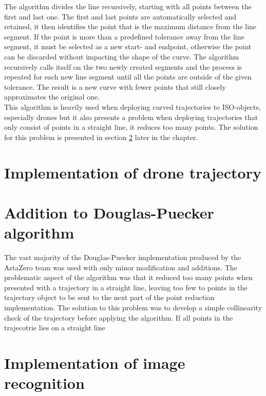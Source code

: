 The algorithm divides the line recursively, starting with all points between the first and last one. The first and last points are automatically selected and retained, it then identifies the point that is the maximum distance from the line segment. If the point is more than a predefined tolerance away from the line segment, it must be selected as a new start- and endpoint, otherwise the point can be discarded without impacting the shape of the curve. The algorithm recursively calls itself on the two newly created segments and the process is repeated for each new line segment until all the points are outside of the given tolerance. The result is a new curve with fewer points that still closely approximates the original one. \\ 

This algorithm is heavily used when deploying curved trajectories to ISO-objects, especially drones but it also presents a problem when deploying trajectories that only consist of points in a straight line, it reduces too many points. The solution for this problem is presented in section \ref{sec:alt_douglas_peucker_algo} later in the chapter. 


\section{Implementation of drone trajectory}

\section{Addition to Douglas-Puecker algorithm}
\label{sec:alt_douglas_peucker_algo}

The vast majority of the Douglas-Puecker implementation produced by the AstaZero team was used with only minor modification and additions. The problematic aspect of the algorithm was that it reduced too many points when presented with a trajectory in a straight line, leaving too few to points in the trajectory object to be sent to the next part of the point reduction implementation. The solution to this problem was to develop a simple collinearity check of the trajectory before applying the algorithm. If all points in the trajecotrie lies on a straight line 


\section{Implementation of image recognition}

